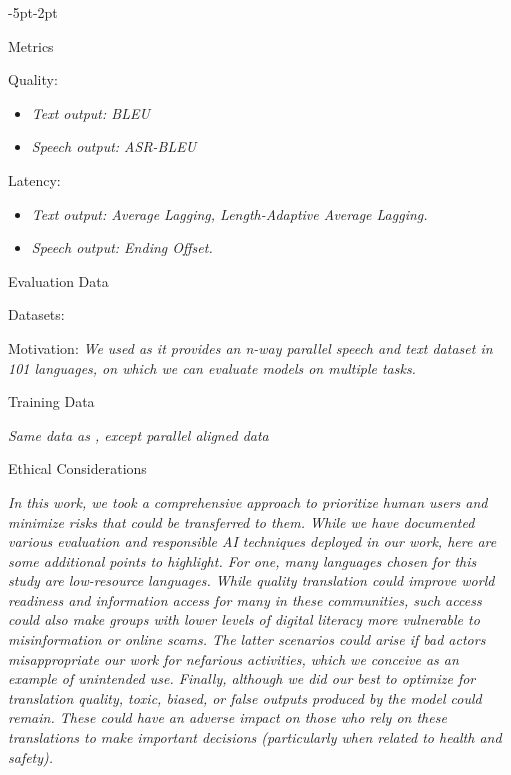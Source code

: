 \begin{adjustwidth}{-5pt}{-2pt}
\begin{singlespace}
\begin{tcolorbox}[title=\textbf{\section{Model Card - \seamlessstreaming}},
    breakable, sharp corners, boxrule=0.5pt]
\begin{mcsection}{Metrics}
    \item Quality:  \begin{itemize}
        \item \textit{Text output: BLEU}
        \item \textit{Speech output: ASR-BLEU}
    \end{itemize}
    \item Latency:
    \begin{itemize}
        \item \textit{Text output: Average Lagging, Length-Adaptive Average Lagging.}
        \item \textit{Speech output: Ending Offset.}
    \end{itemize}
\end{mcsection}


\begin{mcsection}{Evaluation Data}
    \item Datasets: \textit{\fleurs}
\item Motivation: \textit{We used \fleurs as it provides
an n-way parallel speech and text dataset in 101 languages, on which we can evaluate \seamlessstreaming models on multiple tasks.}

\end{mcsection}

\begin{mcsection}{Training Data}
\item \textit{Same data as \mfourttwo, except parallel aligned data}
\end{mcsection}



\begin{mcsection}{Ethical Considerations}
 \item \textit{In this work, we took a comprehensive approach to prioritize human users and minimize risks that could be transferred to them. While we have documented various evaluation and responsible AI techniques deployed in our work, here are some additional points to highlight. For one, many languages chosen for this study are low-resource languages.
 While quality translation could improve world readiness and information access for many in these communities, such access could also make groups with lower levels of digital literacy more vulnerable to misinformation or online scams. The latter scenarios could arise if bad actors misappropriate our work for nefarious activities, which we conceive as an example of unintended use.
 Finally, although we did our best to optimize for translation quality, toxic, biased, or false outputs produced by the model could remain. These could have an adverse impact on those who rely on these translations to make important decisions (particularly when related to health and safety).} 
\end{mcsection}



\end{tcolorbox}
\end{singlespace}
\end{adjustwidth}
